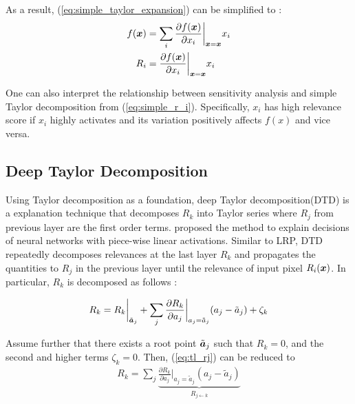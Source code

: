 %
As a result, (\ref{eq:simple_taylor_expansion}) can be simplified to :
\begin{align}
	f(\patvector{x}) &= \sum_{i} \frac{\partial f(\patvector{x})}{\partial x_i}\bigg|_{\patvector{x}={\patvector{x}}}  x_i \\
	R_i &= \frac{\partial f(\patvector{x})}{\partial x_i}\bigg|_{\patvector{x}={\patvector{x}}}  x_i \label{eq:simple_r_i}
\end{align} 

One can also interpret the relationship between sensitivity analysis and simple Taylor decomposition from (\ref{eq:simple_r_i}). Specifically, $x_i$ has high relevance score if $x_i$ highly activates and its variation positively affects $f(x)$ and vice versa.



\subsection{Deep Taylor Decomposition}
Using Taylor decomposition as a foundation, deep Taylor decomposition(DTD) is a explanation technique that decomposes $R_k$ into Taylor series where $R_j$ from previous layer are the first order terms. \cite{MontavonExplainingnonlinearclassification2017} proposed the method to explain decisions of neural networks with piece-wise linear activations. Similar to LRP, DTD repeatedly decomposes relevances at the last layer $R_k$ and propagates the quantities to $R_j$ in the previous layer until the relevance of input pixel $R_i(\boldsymbol{x})$. In particular, $R_k$ is decomposed as follows :




 \begin{align} \label{eq:tl_rj}
 R_k = R_k \bigg|_{ \tilde{\patvector{a}}_j } + \sum_{ j } 	\frac{\partial  R_k }{ \partial a_j } \bigg|_{ a_j = \tilde{a}_j } ( a_j - \tilde{a}_j ) + \zeta_k
 \end{align}

Assume further that there exists a root point $\tilde{\patvector{a}}_j$ such that $R_k = 0$, and the second and higher terms $\zeta_k = 0 $. Then, (\ref{eq:tl_rj}) can be reduced to
\begin{align} \label{eq:R_k_sum}
 R_k = \sum_{ j } \underbrace{	\frac{\partial  R_k }{ \partial a_j } \bigg|_{ a_j = \tilde{a}_j }  ( a_j - \tilde{a}_j ) }_{ R_{j \leftarrow k } }
\end{align}

